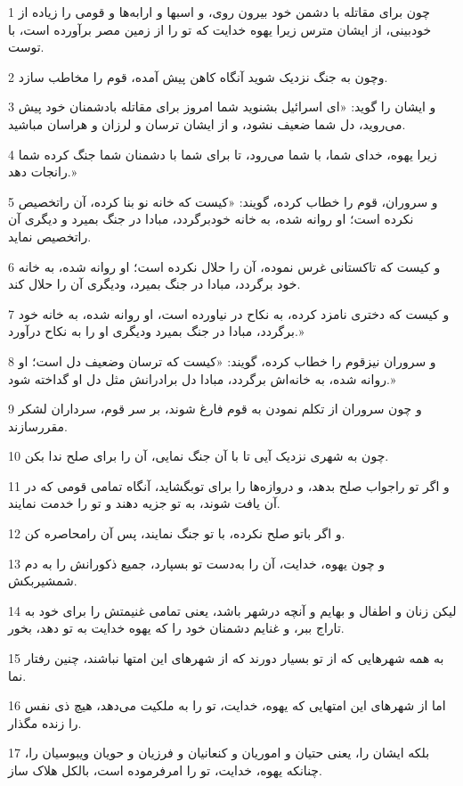 \par 1 چون برای مقاتله با دشمن خود بیرون روی، و اسبها و ارابه‌ها و قومی را زیاده از خودبینی، از ایشان مترس زیرا یهوه خدایت که تو را از زمین مصر برآورده است، با توست.
\par 2 وچون به جنگ نزدیک شوید آنگاه کاهن پیش آمده، قوم را مخاطب سازد.
\par 3 و ایشان را گوید: «ای اسرائیل بشنوید شما امروز برای مقاتله بادشمنان خود پیش می‌روید، دل شما ضعیف نشود، و از ایشان ترسان و لرزان و هراسان مباشید.
\par 4 زیرا یهوه، خدای شما، با شما می‌رود، تا برای شما با دشمنان شما جنگ کرده شما رانجات دهد.»
\par 5 و سروران، قوم را خطاب کرده، گویند: «کیست که خانه نو بنا کرده، آن راتخصیص نکرده است؛ او روانه شده، به خانه خودبرگردد، مبادا در جنگ بمیرد و دیگری آن راتخصیص نماید.
\par 6 و کیست که تاکستانی غرس نموده، آن را حلال نکرده است؛ او روانه شده، به خانه خود برگردد، مبادا در جنگ بمیرد، ودیگری آن را حلال کند.
\par 7 و کیست که دختری نامزد کرده، به نکاح در نیاورده است، او روانه شده، به خانه خود برگردد، مبادا در جنگ بمیرد ودیگری او را به نکاح درآورد.» 
\par 8 و سروران نیزقوم را خطاب کرده، گویند: «کیست که ترسان وضعیف دل است؛ او روانه شده، به خانه‌اش برگردد، مبادا دل برادرانش مثل دل او گداخته شود.»
\par 9 و چون سروران از تکلم نمودن به قوم فارغ شوند، بر سر قوم، سرداران لشکر مقررسازند.
\par 10 چون به شهری نزدیک آیی تا با آن جنگ نمایی، آن را برای صلح ندا بکن.
\par 11 و اگر تو راجواب صلح بدهد، و دروازه‌ها را برای توبگشاید، آنگاه تمامی قومی که در آن یافت شوند، به تو جزیه دهند و تو را خدمت نمایند.
\par 12 و اگر باتو صلح نکرده، با تو جنگ نمایند، پس آن رامحاصره کن.
\par 13 و چون یهوه، خدایت، آن را به‌دست تو بسپارد، جمیع ذکورانش را به دم شمشیربکش.
\par 14 لیکن زنان و اطفال و بهایم و آنچه درشهر باشد، یعنی تمامی غنیمتش را برای خود به تاراج ببر، و غنایم دشمنان خود را که یهوه خدایت به تو دهد، بخور.
\par 15 به همه شهرهایی که از تو بسیار دورند که از شهرهای این امتها نباشند، چنین رفتار نما.
\par 16 اما از شهرهای این امتهایی که یهوه، خدایت، تو را به ملکیت می‌دهد، هیچ ذی نفس را زنده مگذار.
\par 17 بلکه ایشان را، یعنی حتیان و اموریان و کنعانیان و فرزیان و حویان ویبوسیان را، چنانکه یهوه، خدایت، تو را امرفرموده است، بالکل هلاک ساز.

